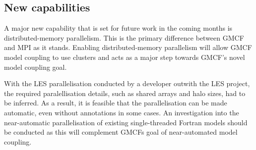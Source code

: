 \subsection{New capabilities}

A major new capability that is set for future work in the coming months is
distributed-memory parallelism. This is the primary difference between GMCF and
MPI as it stands. Enabling distributed-memory parallelism will allow GMCF model
coupling to use clusters and acts as a major step towards GMCF's novel model
coupling goal.

With the LES parallelisation conducted by a developer outwith the LES project,
the required paralellisation details, such as shared arrays and halo sizes, had
to be inferred. As a result, it is feasible that the parallelisation can be made
automatic, even without annotations in some cases. An investigation into the
near-automatic parallelisation of existing single-threaded Fortran models should
be conducted as this will complement GMCFs goal of near-automated model
coupling.
